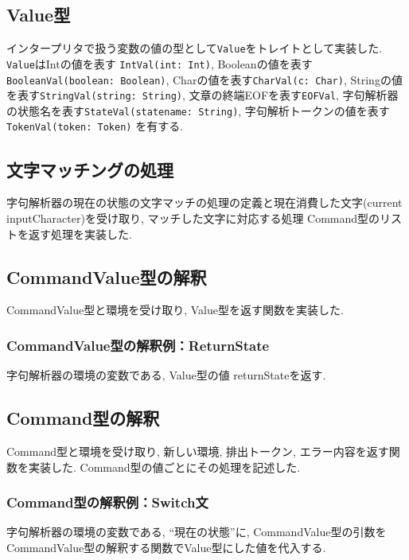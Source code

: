 \documentclass[uplatex,a4j]{jsreport}
\begin{document}
\subsection{Value型}
インタープリタで扱う変数の値の型として\texttt{Value}をトレイトとして実装した. 
\texttt{Value}はIntの値を表す \texttt{IntVal(int: Int)}, 
Booleanの値を表す\texttt{BooleanVal(boolean: Boolean)}, 
Charの値を表す\texttt{CharVal(c: Char)}, 
Stringの値を表す\texttt{StringVal(string: String)}, 
文章の終端EOFを表す\texttt{EOFVal}, 
字句解析器の状態名を表す\texttt{StateVal(statename: String)}, 
字句解析トークンの値を表す\texttt{TokenVal(token: Token)} 
を有する.

\subsection{文字マッチングの処理}
字句解析器の現在の状態の文字マッチの処理の定義と現在消費した文字(current inputCharacter)を受け取り, 
マッチした文字に対応する処理 Command型のリストを返す処理を実装した. 

\subsection{CommandValue型の解釈}
CommandValue型と環境を受け取り, Value型を返す関数を実装した.
\subsubsection{CommandValue型の解釈例：ReturnState}
字句解析器の環境の変数である, Value型の値 returnStateを返す. 

\subsection{Command型の解釈}
Command型と環境を受け取り, 新しい環境, 排出トークン, エラー内容を返す関数を実装した. 
Command型の値ごとにその処理を記述した. 
\subsubsection{Command型の解釈例：Switch文}
字句解析器の環境の変数である, ``現在の状態''に, 
CommandValue型の引数をCommandValue型の解釈する関数でValue型にした値を代入する. 

\end{document}
